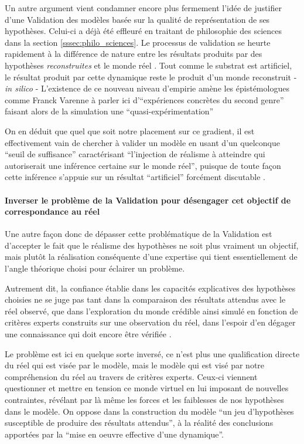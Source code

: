 Un autre argument vient condamner encore plus fermement l'idée de justifier d'une Validation des modèles basée sur la qualité de représentation de ses hypothèses. Celui-ci a déjà été effleuré en traitant de philosophie des sciences dans la section \ref{sssec:philo_sciences}. Le processus de validation se heurte rapidement à la différence de nature entre les résultats produits par des hypothèses \textit{reconstruites} et le monde réel . Tout comme le substrat est artificiel, le résultat produit par cette dynamique reste le produit d'un monde reconstruit - \textit{in silico} - L'existence de ce nouveau niveau d'empirie amène les épistémologues comme Franck Varenne à parler ici d'\enquote{expériences concrètes du second genre} faisant alors de la simulation une \enquote{quasi-expérimentation} \autocites{Varenne2001, Varenne2007, Phan2008, Phan2010}

On en déduit que quel que soit notre placement sur ce gradient, il est effectivement vain de chercher à valider un modèle en usant d'un quelconque \enquote{seuil de suffisance} caractérisant \enquote{l'injection de réalisme à atteindre qui autoriserait une inférence certaine sur le monde réel}, puisque de toute façon cette inférence s'appuie sur un résultat \enquote{artificiel} forcément discutable .

\paragraph{Inverser le problème de la Validation pour désengager cet objectif de correspondance au réel}
\label{p:inverser_problematique}

Une autre façon donc de dépasser cette problématique de la Validation est d'accepter le fait que le réalisme des hypothèses ne soit plus vraiment un objectif, mais plutôt la réalisation conséquente d'une expertise qui tient essentiellement de l'angle théorique choisi pour éclairer un problème.

Autrement dit, la confiance établie dans les capacités explicatives des hypothèses choisies ne se juge pas tant dans la comparaison des résultats attendus avec le réel observé, que dans l'exploration du monde crédible ainsi simulé en fonction de critères experts construits sur une observation du réel, dans l'espoir d'en dégager une connaissance qui doit encore être vérifiée .

Le problème est ici en quelque sorte inversé, ce n'est plus une qualification directe du réel qui est visée par le modèle, mais le modèle qui est visé par notre compréhension du réel au travers de critères experts. Ceux-ci viennent questionner et mettre en tension ce monde virtuel en lui imposant de nouvelles contraintes, révélant par là même les forces et les faiblesses de nos hypothèses dans le modèle. On oppose dans la construction du modèle \enquote{un jeu d'hypothèses susceptible de produire des résultats attendus}, à la réalité des conclusions apportées par la \enquote{mise en oeuvre effective d'une dynamique}.

